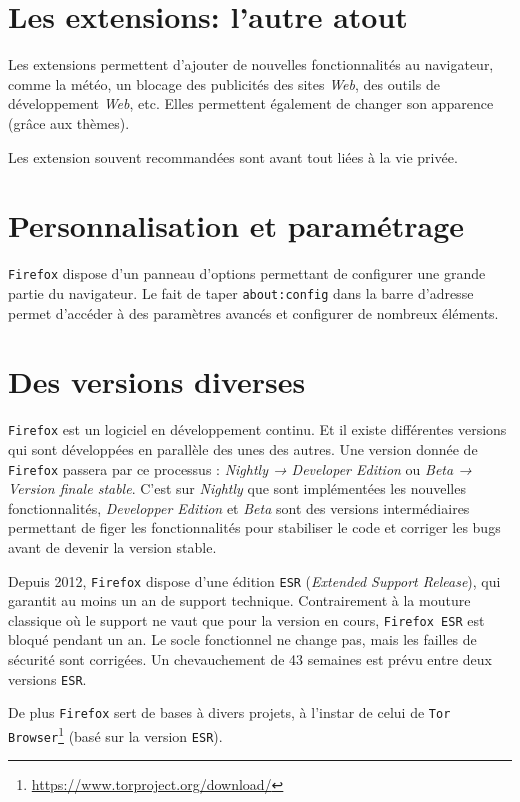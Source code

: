 \documentclass[a4paper,11pt]{book}
\begin{document}
\section*{Les extensions: l'autre atout}
Les extensions permettent d’ajouter de nouvelles fonctionnalités au navigateur, comme la météo, un blocage des publicités des sites \textit{Web}, des outils de développement \textit{Web}, etc. Elles permettent également de changer son apparence (grâce aux thèmes).
\medskip

Les extension souvent recommandées sont avant tout liées à la vie privée.
\medskip

\section*{Personnalisation et paramétrage}
\texttt{Firefox} dispose d’un panneau d’options permettant de configurer une grande partie du navigateur. Le fait de taper \texttt{about:config} dans la barre d’adresse permet d’accéder à des paramètres avancés et configurer de nombreux éléments.
\medskip

\section*{Des versions diverses}
\texttt{Firefox} est un logiciel en développement continu. Et il existe différentes versions qui sont développées en parallèle des unes des autres. Une version donnée de \texttt{Firefox} passera par ce processus : \textit{Nightly → Developer Edition} ou \textit{Beta → Version finale stable}. C'est sur \textit{Nightly} que sont implémentées les nouvelles fonctionnalités, \textit{Developper Edition} et \textit{Beta} sont des versions intermédiaires permettant de figer les fonctionnalités pour stabiliser le code et corriger les bugs avant de devenir la version stable.
\medskip

Depuis 2012, \texttt{Firefox} dispose d'une édition \texttt{ESR} (\textit{Extended Support Release}), qui garantit au moins un an de support technique. Contrairement à la mouture classique où le support ne vaut que pour la version en cours, \texttt{Firefox ESR} est \og bloqué\fg{} pendant un an. Le socle fonctionnel ne change pas, mais les failles de sécurité sont corrigées. Un chevauchement de 43 semaines est prévu entre deux versions \texttt{ESR}.
\medskip

De plus \texttt{Firefox} sert de bases à divers projets, à l'instar de celui de \texttt{Tor Browser}\footnote{\url{https://www.torproject.org/download/}} (basé sur la version \texttt{ESR}).
\medskip
\end{document}
